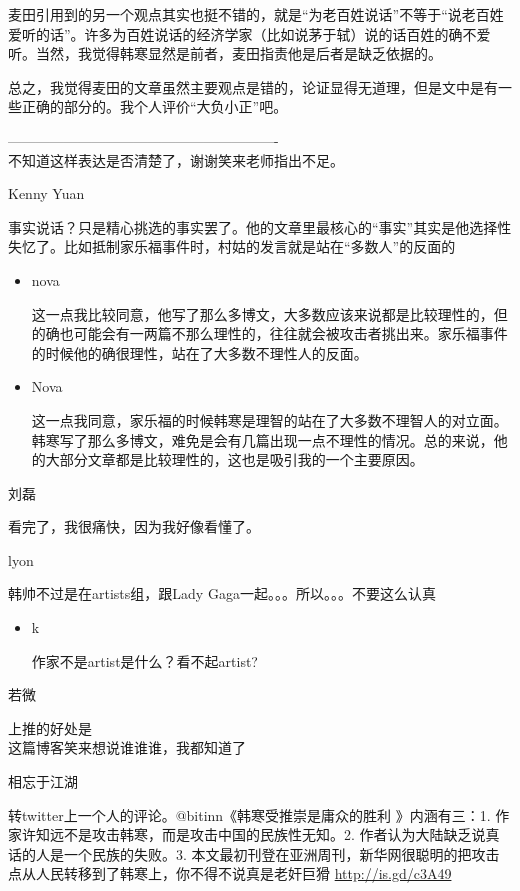 \begin{itemize}[<+->]
  麦田引用到的另一个观点其实也挺不错的，就是``为老百姓说话''不等于``说老百姓爱听的话''。许多为百姓说话的经济学家（比如说茅于轼）说的话百姓的确不爱听。当然，我觉得韩寒显然是前者，麦田指责他是后者是缺乏依据的。

  总之，我觉得麦田的文章虽然主要观点是错的，论证显得无道理，但是文中是有一些正确的部分的。我个人评价``大负小正''吧。

  ----------------------------------------------------------\\
  不知道这样表达是否清楚了，谢谢笑来老师指出不足。
\end{itemize}

Kenny Yuan

事实说话？只是精心挑选的事实罢了。他的文章里最核心的``事实''其实是他选择性失忆了。比如抵制家乐福事件时，村姑的发言就是站在``多数人''的反面的

\begin{itemize}[<+->]
\item
  nova

  这一点我比较同意，他写了那么多博文，大多数应该来说都是比较理性的，但的确也可能会有一两篇不那么理性的，往往就会被攻击者挑出来。家乐福事件的时候他的确很理性，站在了大多数不理性人的反面。
\item
  Nova

  这一点我同意，家乐福的时候韩寒是理智的站在了大多数不理智人的对立面。韩寒写了那么多博文，难免是会有几篇出现一点不理性的情况。总的来说，他的大部分文章都是比较理性的，这也是吸引我的一个主要原因。
\end{itemize}

刘磊

看完了，我很痛快，因为我好像看懂了。

lyon

韩帅不过是在artists组，跟Lady Gaga一起。。。所以。。。不要这么认真

\begin{itemize}[<+->]
\item
  k

  作家不是artist是什么？看不起artist?
\end{itemize}

若微

上推的好处是\\ 这篇博客笑来想说谁谁谁，我都知道了

相忘于江湖

转twitter上一个人的评论。@bitinn《韩寒受推崇是庸众的胜利 》内涵有三：1.
作家许知远不是攻击韩寒，而是攻击中国的民族性无知。2.
作者认为大陆缺乏说真话的人是一个民族的失败。3.
本文最初刊登在亚洲周刊，新华网很聪明的把攻击点从人民转移到了韩寒上，你不得不说真是老奸巨猾
\href{/web/20131011170823/http://is.gd/c3A49}{http://is.gd/c3A49}

